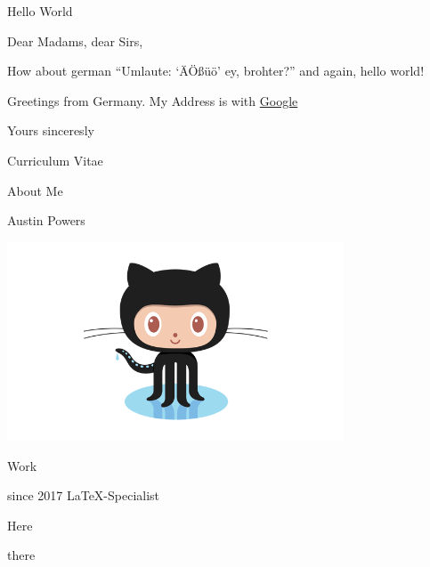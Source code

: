 \documentclass{scrlttr2}
\begin{document}
\begin{letter}{
	Hello World
}
\opening{Dear Madams, dear Sirs,}
How about german \enquote{Umlaute: \enquote{ÄÖßüö} \textendash ey, brohter?}
and again, hello world!

Greetings from Germany. My Address is with \href{http://www.google.de}{Google}

\closing{Yours sinceresly}
\begin{cv}{Curriculum Vitae}
 \begin{minipage}[t]{0.7\textwidth}
  \begin{cvlist}{About Me}%
   \item Austin Powers
  \end{cvlist}
 \end{minipage}
 \begin{minipage}{0.3\textwidth}
  \begin{flushright}
   \includegraphics[width=0.75\textwidth]{octocat.png}
  \end{flushright}
 \end{minipage}

 \begin{cvlist}{Work}%
  \item[since 2017] \LaTeX-Specialist
  \begin{compactitem}
   \item Here
   \item there
  \end{compactitem}
 \end{cvlist}
\end{cv}

\end{letter}
\end{document}
